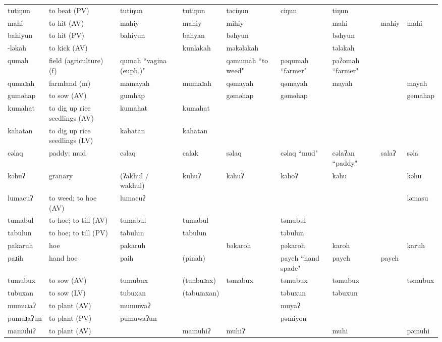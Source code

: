 \begin{landscape}
\begin{longtable}{*{9}{p{}}}
\text{*}tutiŋun & to beat (PV) & tutiŋun & tutiŋun & təciŋun & ciŋun & tiŋun &  & \\
\text{*}mahi & to hit (AV) & mahiy & mahiy & mihiy &  & mahi & mahiy & mahi\\
\text{*}bahiyun & to hit (PV) & bahiyun & bahyan & bəhyun &  & bəhyun &  & \\
\text{*}-ləkah & to kick (AV) &  & kunlakah & məkələkah &  & tələkah &  & \\
\text{*}qumah & field (agriculture) (f) & qumah ``vagina (euph.)" &  & qəmumah ``to weed" & pəqumah ``farmer" & pəʔomah ``farmer" &  & \\
\text{*}qumaɹah & farmland (m) & mamayah & mumaɹah & qəmayah & qəmayah & mayah &  & mayah\\
\text{*}guməhap & to sow (AV) & gumhap &  & gəməhap & gəməhap &  &  & gəmahap\\
\text{*}kumahat & to dig up rice seedlings (AV) & kumahat & kumahat &  &  &  &  & \\
\text{*}kahatan & to dig up rice seedlings (LV) & kahatan & kahatan &  &  &  &  & \\
\text{*}cəlaq & paddy; mud & cəlaq & calak & səlaq & cəlaq ``mud" & cəlaʔan ``paddy" & salaʔ & səla\\
\text{*}kəhuʔ & granary & (ʔakhul / wakhul) & kuhuʔ & kəhuʔ & kəhoʔ & kəhu &  & kəhu\\
\text{*}lumacuʔ & to weed; to hoe (AV) & lumacuʔ &  &  &  &  &  & ləmasu\\
\text{*}tumabul & to hoe; to till (AV) & tumabul & tumabul &  & təmubul &  &  & \\
\text{*}tabulun & to hoe; to till (PV) & tabulun & tabulun &  & təbulun &  &  & \\
\text{*}pakaruh & hoe & pakaruh &  & bəkaroh & pəkaroh & karoh &  & karuh\\
\text{*}paɹih & hand hoe & paih & (pinah) &  & payeh ``hand spade" & payeh & payeh & \\
\text{*}tumubux & to sow (AV) & tumubux & (tunbuɹax) & təmabux & təmubux & təmubux &  & təmubux\\
\text{*}tubuxan & to sow (LV) & tubuxan & (tabuɹaxan) &  & təbuxun & təbuxun &  & \\
\text{*}mumuɹaʔ & to plant (AV) & mumuwaʔ &  &  & muyaʔ &  &  & \\
\text{*}pumuɹaʔun & to plant (PV) & pumuwaʔun &  &  & pəmiyon &  &  & \\
\text{*}mamuhiʔ & to plant (AV) &  & mamuhiʔ & muhiʔ &  & muhi &  & pəmuhi\\

\end{longtable}
\end{landscape}
